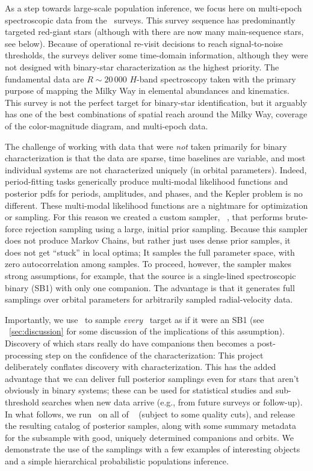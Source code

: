 \documentclass[modern]{aastex63}
\begin{document}
As a step towards large-scale population inference, we focus here on multi-epoch
spectroscopic data from the \apogee\ surveys.
This survey sequence has predominantly targeted red-giant stars (although with
 there are now many main-sequence stars, see below).
Because of operational re-visit decisions to reach signal-to-noise thresholds,
the surveys deliver some time-domain information, although they were not
designed with binary-star characterization as the highest priority.
The fundamental data are $R\sim 20\,000$ $H$-band spectroscopy taken with the
primary purpose of mapping the Milky Way in elemental abundances and kinematics.
This survey is not the perfect target for binary-star identification, but it
arguably has one of the best combinations of spatial reach around the Milky Way,
coverage of the color-magnitude diagram, and multi-epoch data.

The challenge of working with data that were \emph{not} taken primarily for
binary characterization is that the data are sparse, time baselines are
variable, and most individual systems are not characterized uniquely (in orbital
parameters).
Indeed, period-fitting tasks generically produce multi-modal likelihood
functions and posterior pdfs for periods, amplitudes, and phases, and the Kepler
problem is no different.
These multi-modal likelihood functions are a nightmare for optimization or
sampling.
For this reason we created a custom sampler, \thejoker\ \citep{thejoker}, that
performs brute-force rejection sampling using a large, initial prior sampling.
Because this sampler does not produce Markov Chains, but rather just uses dense
prior samples, it does not get ``stuck'' in local optima; It samples the full
parameter space, with zero autocorrelation among samples.
To proceed, however, the sampler makes strong assumptions, for example, that the
source is a single-lined spectroscopic binary (SB1) with only one companion.
The advantage is that it generates full samplings over orbital parameters for
arbitrarily sampled radial-velocity data.

Importantly, we use \thejoker\ to sample \emph{every} \apogee\ target as if it
were an SB1 (see \sectionname~\ref{sec:discussion} for some discussion of the
implications of this assumption).
Discovery of which stars really do have companions then becomes a
post-processing step on the confidence of the characterization: This project
deliberately conflates discovery with characterization.
This has the added advantage that we can deliver full posterior samplings even
for stars that aren't obviously in binary systems; these can be used for
statistical studies and sub-threshold searches when new data arrive (e.g., from
future surveys or follow-up).
In what follows, we run \thejoker\ on all of \apogee\  (subject to some
quality cuts), and release the resulting catalog of posterior samples, along
with some summary metadata for the subsample with good, uniquely determined
companions and orbits.
We demonstrate the use of the samplings with a few examples of interesting
objects and a simple hierarchical probabilistic populations inference.
\end{document}
